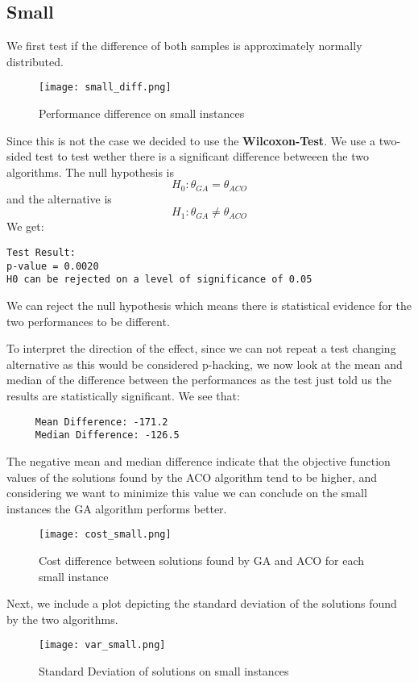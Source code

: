 \documentclass{article}
\begin{document}
\subsection{Small}
We first test if the difference of both samples is approximately normally distributed.
\begin{figure}[H]
    \centering
    \texttt{[image: small\_diff.png]}
    \caption{Performance difference on small instances}
    \label{fig:enter-label}
\end{figure}
 Since this is not the case we decided to use the \textbf{Wilcoxon-Test}.  We use a two-sided test to test wether there is a significant difference betweeen the two algorithms. The null hypothesis is $$
 H_0 : \theta_{GA} = \theta_{ACO} $$
 and the alternative is
 $$
 H_1 : \theta_{GA} \neq \theta_{ACO}
 $$
 We get: 
 \begin{verbatim}
Test Result: 
p-value = 0.0020 
H0 can be rejected on a level of significance of 0.05 
 \end{verbatim}
 We can reject the null hypothesis which means there is statistical evidence for the two performances to be different.

 To interpret the direction of the effect, since we can not repeat a test changing alternative as this would be considered p-hacking, we now look at the mean and median of the difference between the performances as the test just told us the results are statistically significant. 
 We see that:
 \begin{verbatim}
     Mean Difference: -171.2 
     Median Difference: -126.5 
 \end{verbatim}

 The negative mean and median difference indicate that the objective function values of the solutions found by the ACO algorithm tend to be higher, and considering we want to minimize this value we can conclude on the small instances the GA algorithm performs better.
 \begin{figure}[H]
     \centering
     \texttt{[image: cost\_small.png]}
     \caption{Cost difference between solutions found by GA and ACO for each small instance}
     \label{fig:enter-label}
 \end{figure}

Next, we include a plot depicting the standard deviation of the solutions found by the two algorithms.
 \begin{figure}[H]
     \centering
     \texttt{[image: var\_small.png]}
     \caption{Standard Deviation of solutions on small instances}
     \label{fig:enter-label}
 \end{figure}
 
\end{document}
